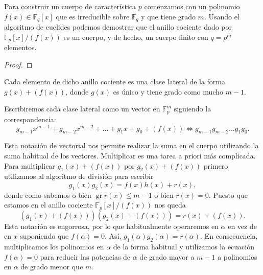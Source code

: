 
Para construir un cuerpo de característica \(p\) comenzamos con un polinomio \(f(x) \in \mathbb F_q[x]\) que es irreducible sobre \(\mathbb F_q\) y que tiene grado \(m\).
Usando el algoritmo de euclides podemos demostrar que el anillo cociente dado por \(\mathbb F_p[x]/(f(x))\) es un cuerpo, y de hecho, un cuerpo finito con \(q = p^m\) elementos.

\begin{proof}
\end{proof}

Cada elemento de dicho anillo cociente es una clase lateral de la forma \(g(x) + (f(x))\), donde \(g(x)\) es único y tiene grado como mucho \(m-1\).

Escribiremos cada clase lateral como un vector en \(\mathbb F_p^m\) siguiendo la correspondencia:
\[
  g_{m-1}x^{m-1} + g_{m-2}x^{m-2}+ \dots + g_1x + g_0 + (f(x)) \iff g_{m-1}g_{m-2}\dots g_1g_0.
\]

Esta notación de vectorial nos permite realizar la suma en el cuerpo utilizando la suma habitual de los vectores.
Multiplicar es una tarea a priori más complicada.
Para multiplicar \(g_1(x) + (f(x))\) por \(g_2(x) + (f(x))\) primero utilizamos al algoritmo de división para escribir
\[
  g_1(x)g_2(x) = f(x)h(x) + r(x),
\]
donde como sabemos o bien \(\operatorname{gr} r(x) \leq m -1\) o bien \(r(x) = 0\).
Puesto que estamos en el anillo cociente \(\mathbb F_p[x]/(f(x))\) nos queda
\[
  (g_1(x) + (f(x)))(g_2(x) + (f(x))) = r(x) + (f(x)).
\]
Esta notación es engorrosa, por lo que habitualmente operaremos en \(\alpha\) en vez de en \(x\) suponiendo que \(f(\alpha) = 0\).
Así, \(g_1(\alpha)g_2(\alpha) = r(\alpha)\).
En consecuencia, multiplicamos los polinomios en \(\alpha\) de la forma habitual y utilizamos la ecuación \(f(\alpha) = 0\) para reducir las potencias de \(\alpha\) de grado mayor a \(m-1\) a polinomios en \(\alpha\) de grado menor que \(m\).

